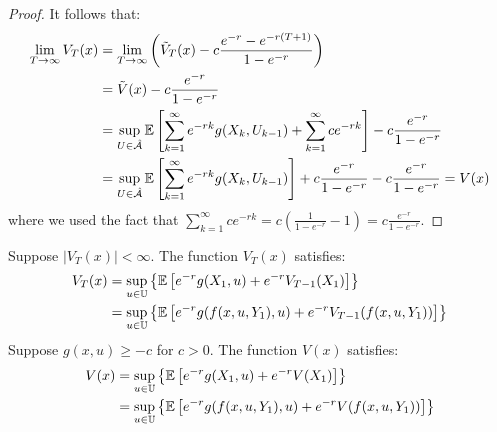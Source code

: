 \begin{proof}
    It follows that:
    \begin{align*}
        \lim_{T \to \infty} V_T(x) &= \lim_{T \to \infty} \left( \tilde{V}_T(x) - c \frac{e^{-r} - e^{-r(T+1)}}{1 - e^{-r}} \right) \\
        &= \tilde{V}(x) - c \frac{e^{-r}}{1 - e^{-r}} \\
        &= \sup_{U \in \hat{\mathcal{A}}} \mathbb E \left[ \sum_{k=1}^\infty e^{-rk} g(X_k, U_{k-1}) + \sum_{k=1}^\infty c e^{-rk} \right] - c \frac{e^{-r}}{1 - e^{-r}} \\
        &= \sup_{U \in \hat{\mathcal{A}}} \mathbb E \left[ \sum_{k=1}^\infty e^{-rk} g(X_k, U_{k-1}) \right] + c \frac{e^{-r}}{1 - e^{-r}} - c \frac{e^{-r}}{1 - e^{-r}} = V(x)
    \end{align*}
    where we used the fact that $\sum_{k=1}^\infty c e^{-rk} = c \left( \frac{1}{1 - e^{-r}} - 1 \right) = c \frac{e^{-r}}{1 - e^{-r}}$.
\end{proof}

\begin{lemma}
    Suppose $|V_T(x)| < \infty$. The function $V_T(x)$ satisfies:
    \begin{align*}
        V_T(x) &= \sup_{u \in \mathbb{U}} \left\{ \mathbb E \left[ e^{-r} g(X_1, u) + e^{-r} V_{T-1}(X_1) \right] \right\} \\
        &= \sup_{u \in \mathbb{U}} \left\{ \mathbb E \left[ e^{-r} g(f(x, u, Y_1), u) + e^{-r} V_{T-1}(f(x, u, Y_1)) \right] \right\}
    \end{align*}
    Suppose $g(x, u) \geq -c$ for $c > 0$. The function $V(x)$ satisfies:
    \begin{align*}
        V(x) &= \sup_{u \in \mathbb{U}} \left\{ \mathbb E \left[ e^{-r} g(X_1, u) + e^{-r} V(X_1) \right] \right\} \\
        &= \sup_{u \in \mathbb{U}} \left\{ \mathbb E \left[ e^{-r} g(f(x, u, Y_1), u) + e^{-r} V(f(x, u, Y_1)) \right] \right\}
    \end{align*}
\end{lemma}

